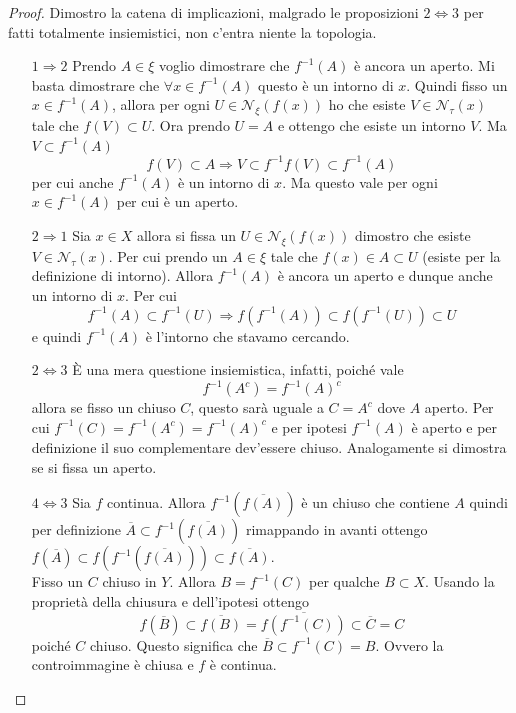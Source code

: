 \begin{proof}
	Dimostro la catena di implicazioni, malgrado le proposizioni $2 \Leftrightarrow 3$ per fatti totalmente insiemistici, non c'entra niente la topologia.
	\begin{enumerate}
		\item[$1 \Rightarrow 2$] Prendo $A \in \xi$ voglio dimostrare che $f^{-1}(A)$ è ancora un aperto. Mi basta dimostrare che $\forall x \in f^{-1}(A)$ questo è un intorno di $x$. Quindi fisso un $x \in f^{-1}(A)$, allora per ogni $U \in \mathcal{N}_\xi(f(x))$ ho che esiste $V \in \mathcal{N}_\tau(x)$ tale che $f(V) \subset U$. Ora prendo $U = A$ e ottengo che esiste un intorno $V$. Ma $V \subset f^{-1}(A)$
		\begin{equation*}
			f(V) \subset A \Longrightarrow V \subset f^{-1}f(V) \subset f^{-1}(A)
		\end{equation*}
		per cui anche $f^{-1}(A)$ è un intorno di $x$. Ma questo vale per ogni $x \in f^{-1}(A)$ per cui è un aperto.
		\item[$2 \Rightarrow 1$] Sia $x \in X$ allora si fissa un $U \in \mathcal{N}_\xi(f(x))$ dimostro che esiste $V \in \mathcal{N}_\tau(x)$. Per cui prendo un $A \in \xi$ tale che $f(x) \in A \subset U$ (esiste per la definizione di intorno). Allora $f^{-1}(A)$ è ancora un aperto e dunque anche un intorno di $x$. Per cui 
		\begin{equation*}
			f^{-1}(A) \subset f^{-1}(U) \Longrightarrow f(f^{-1}(A)) \subset f(f^{-1}(U)) \subset U
		\end{equation*}
		e quindi $f^{-1}(A)$ è l'intorno che stavamo cercando.
		\item[$2 \Leftrightarrow 3$] È una mera questione insiemistica, infatti, poiché vale 
		\begin{equation*}
			f^{-1}(A^c) = f^{-1}(A)^c
		\end{equation*}
		allora se fisso un chiuso $C$, questo sarà uguale a $C = A^c$ dove $A$ aperto. Per cui $f^{-1}(C) = f^{-1}(A^c) = f^{-1}(A)^c$ e per ipotesi $f^{-1}(A)$ è aperto e per definizione il suo complementare dev'essere chiuso. Analogamente si dimostra se si fissa un aperto.
		\item[$4 \Leftrightarrow 3$] Sia $f$ continua. Allora $f^{-1}(\overline{f(A)})$ è un chiuso che contiene $A$ quindi per definizione $\overline{A} \subset f^{-1}(\overline{f(A)})$ rimappando in avanti ottengo 
		$f(\overline{A}) \subset f(f^{-1}(\overline{f(A)})) 
		\subset \overline{f(A)}$.\\
		
		Fisso un $C$ chiuso in $Y$. Allora $B = f^{-1}(C)$ per qualche $B \subset X$. Usando la proprietà della chiusura e dell'ipotesi ottengo  
		\begin{equation*}
			f(\overline{B}) \subset \overline{f(B)} = \overline{f(f^{-1}(C))} \subset \overline{C} = C
		\end{equation*}
		poiché $C$ chiuso. Questo significa che $\overline{B} \subset f^{-1}(C) = B$. Ovvero la controimmagine è chiusa e $f$ è continua.
\end{enumerate}
\end{proof}

